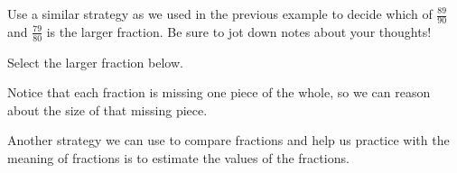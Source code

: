 \documentclass{ximera}
\begin{document}
\begin{question}
Use a similar strategy as we used in the previous example to decide which of $\frac{89}{90}$ and $\frac{79}{80}$ is the larger fraction. Be sure to jot down notes about your thoughts!

Select the larger fraction below.
\begin{multipleChoice}
\end{multipleChoice}
\begin{hint}
Notice that each fraction is missing one piece of the whole, so we can reason about the size of that missing piece.
\end{hint}
\end{question}


Another strategy we can use to compare fractions and help us practice with the meaning of fractions is to estimate the values of the fractions.
\end{document}
